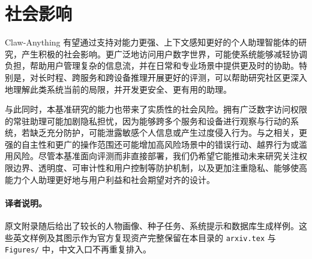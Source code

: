 \documentclass[10pt]{article}
\begin{document}
\section{社会影响}
\label{sec:social_impact}

Claw-Anything 有望通过支持对能力更强、上下文感知更好的个人助理智能体的研究，产生积极的社会影响。更广泛地访问用户数字世界，可能使系统能够减轻协调负担，帮助用户管理复杂的信息流，并在日常和专业场景中提供更及时的协助。特别是，对长时程、跨服务和跨设备推理开展更好的评测，可以帮助研究社区更深入地理解此类系统当前的局限，并开发更安全、更有用的助理。

与此同时，本基准研究的能力也带来了实质性的社会风险。拥有广泛数字访问权限的常驻助理可能加剧隐私担忧，因为能够跨多个服务和设备进行观察与行动的系统，若缺乏充分防护，可能泄露敏感个人信息或产生过度侵入行为。与之相关，更强的自主性和更广的操作范围还可能增加高风险场景中的错误行动、越界行为或滥用风险。尽管本基准面向评测而非直接部署，我们仍希望它能推动未来研究关注权限边界、透明度、可审计性和用户控制等防护机制，以及更加注重隐私、能够使高能力个人助理更好地与用户利益和社会期望对齐的设计。

\paragraph{译者说明。}原文附录随后给出了较长的人物画像、种子任务、系统提示和数据库生成样例。这些英文样例及其图示作为官方复现资产完整保留在本目录的 \texttt{arxiv.tex} 与 \texttt{Figures/} 中，中文入口不再重复排入。



\end{document}
